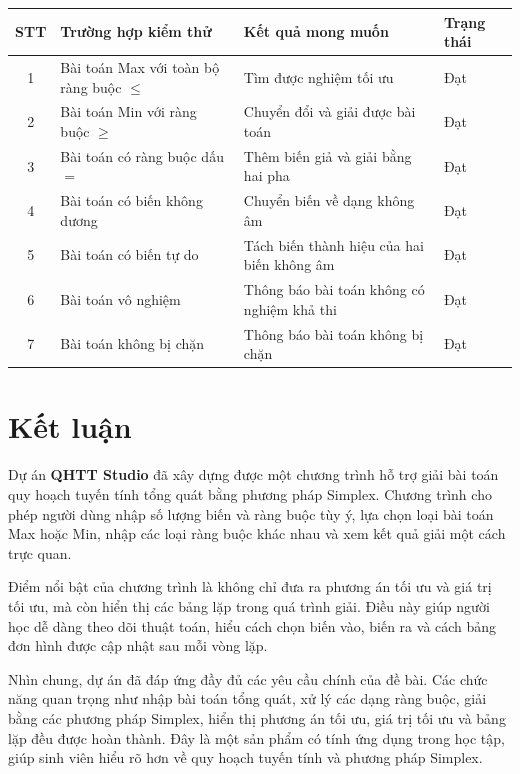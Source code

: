 \documentclass[14pt, a4paper]{extarticle}
\begin{document}
    \begin{longtable}{|c|p{5cm}|p{5cm}|p{3cm}|}
    \hline
    \textbf{STT} & \textbf{Trường hợp kiểm thử} & \textbf{Kết quả mong muốn} & \textbf{Trạng thái} \\
    \hline
    1 & Bài toán Max với toàn bộ ràng buộc $\leq$ & Tìm được nghiệm tối ưu & Đạt \\
    \hline
    2 & Bài toán Min với ràng buộc $\geq$ & Chuyển đổi và giải được bài toán & Đạt \\
    \hline
    3 & Bài toán có ràng buộc dấu $=$ & Thêm biến giả và giải bằng hai pha & Đạt \\
    \hline
    4 & Bài toán có biến không dương & Chuyển biến về dạng không âm & Đạt \\
    \hline
    5 & Bài toán có biến tự do & Tách biến thành hiệu của hai biến không âm & Đạt \\
    \hline
    6 & Bài toán vô nghiệm & Thông báo bài toán không có nghiệm khả thi & Đạt \\
    \hline
    7 & Bài toán không bị chặn & Thông báo bài toán không bị chặn & Đạt \\
    \hline
    \end{longtable}
    
    \section{Kết luận}
    
    Dự án \textbf{QHTT Studio} đã xây dựng được một chương trình hỗ trợ giải bài toán quy hoạch tuyến tính tổng quát bằng phương pháp Simplex. Chương trình cho phép người dùng nhập số lượng biến và ràng buộc tùy ý, lựa chọn loại bài toán Max hoặc Min, nhập các loại ràng buộc khác nhau và xem kết quả giải một cách trực quan.
    
    Điểm nổi bật của chương trình là không chỉ đưa ra phương án tối ưu và giá trị tối ưu, mà còn hiển thị các bảng lặp trong quá trình giải. Điều này giúp người học dễ dàng theo dõi thuật toán, hiểu cách chọn biến vào, biến ra và cách bảng đơn hình được cập nhật sau mỗi vòng lặp.
    
    Nhìn chung, dự án đã đáp ứng đầy đủ các yêu cầu chính của đề bài. Các chức năng quan trọng như nhập bài toán tổng quát, xử lý các dạng ràng buộc, giải bằng các phương pháp Simplex, hiển thị phương án tối ưu, giá trị tối ưu và bảng lặp đều được hoàn thành. Đây là một sản phẩm có tính ứng dụng trong học tập, giúp sinh viên hiểu rõ hơn về quy hoạch tuyến tính và phương pháp Simplex.
    
\end{document}
